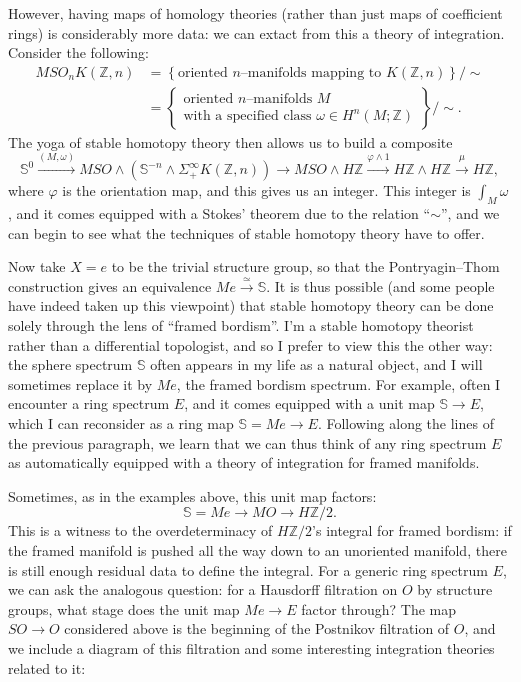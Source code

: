 \documentclass{amsart}
\newcommand{\Z}{\mathbb Z}
\renewcommand{\S}{\mathbb S}
\newcommand{\<}{\langle}
\renewcommand{\>}{\rangle}
\newcommand{\sm}{\wedge}
\newcommand{\Susp}{\Sigma}
\renewcommand{\phi}{\varphi}
\newcommand{\Spin}{\mathit{Spin}}
\numberwithin{equation}{section}
\theoremstyle{plain}
\theoremstyle{definition}
\theoremstyle{remark}
\begin{document}
However, having maps of homology theories (rather than just maps of coefficient rings) is considerably more data: we can extact from this a theory of integration.  Consider the following:
\begin{align*}
MSO_n K(\Z, n) & = \left\{ \text{oriented $n$--manifolds mapping to $K(\Z, n)$} \right\} / \sim \\
& = \left\{ \begin{array}{c}\text{oriented $n$--manifolds $M$} \\ \text{with a specified class $\omega \in H^n(M; \Z)$} \end{array}\right\} / \sim.
\end{align*}
The yoga of stable homotopy theory then allows us to build a composite \[\S^0 \xrightarrow{(M, \omega)} MSO \sm (\S^{-n} \sm \Susp^\infty_+ K(\Z, n)) \to MSO \sm H\Z \xrightarrow{\phi \sm 1} H\Z \sm H\Z \xrightarrow\mu H\Z,\] where $\phi$ is the orientation map, and this gives us an integer. This integer is $\int_M \omega$, and it comes equipped with a Stokes' theorem due to the relation ``$\sim$'', and we can begin to see what the techniques of stable homotopy theory have to offer.

Now take $X = e$ to be the trivial structure group, so that the Pontryagin--Thom construction gives an equivalence $Me \xrightarrow{\simeq} \S$.  It is thus possible (and some people have indeed taken up this viewpoint) that stable homotopy theory can be done solely through the lens of ``framed bordism''. I'm a stable homotopy theorist rather than a differential topologist, and so I prefer to view this the other way: the sphere spectrum $\S$ often appears in my life as a natural object, and I will sometimes replace it by $Me$, the framed bordism spectrum.  For example, often I encounter a ring spectrum $E$, and it comes equipped with a unit map $\S \to E$, which I can reconsider as a ring map $\S = Me \to E$.  Following along the lines of the previous paragraph, we learn that we can thus think of any ring spectrum $E$ as automatically equipped with a theory of integration for framed manifolds.

Sometimes, as in the examples above, this unit map factors: \[\S = Me \to MO \to H\Z/2.\]  This is a witness to the overdeterminacy of $H\Z/2$'s integral for framed bordism: if the framed manifold is pushed all the way down to an unoriented manifold, there is still enough residual data to define the integral.  For a generic ring spectrum $E$, we can ask the analogous question: for a Hausdorff filtration on $O$ by structure groups, what stage does the unit map $Me \to E$ factor through?  The map $SO \to O$ considered above is the beginning of the Postnikov filtration of $O$, and we include a diagram of this filtration and some interesting integration theories related to it:
\begin{center}
\end{center}
\end{document}
